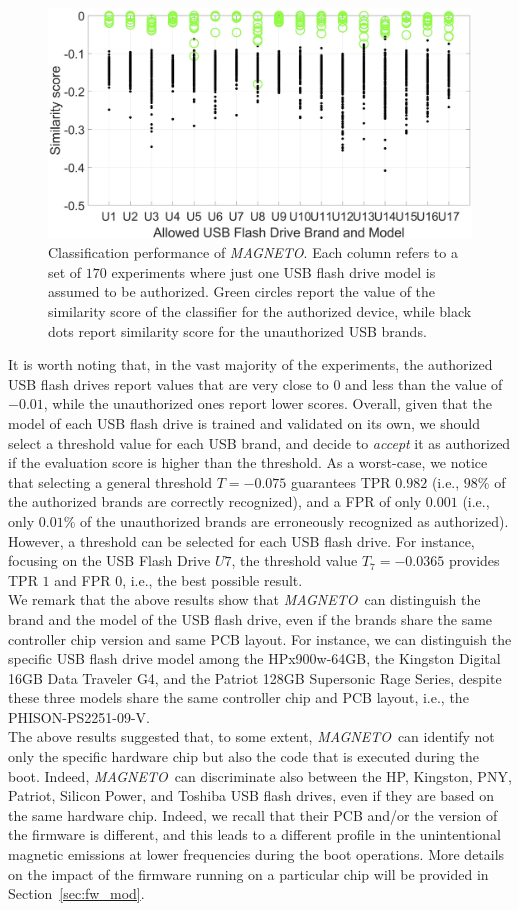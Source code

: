 \documentclass[acmsmall, authorversion]{acmart}
\newcommand{\sol}{\emph{MAGNETO}}
\begin{document}
\begin{figure}[htbp]
    \includegraphics[width=.6\columnwidth]{Figures/scenario1_svm_final.png}
    \centering
    \caption{Classification performance of \sol. Each column refers to a set of $170$ experiments where just one USB flash drive model is assumed to be authorized. Green circles report the value of the similarity score of the classifier for the authorized device, while black dots report similarity score for the unauthorized USB brands.}
    \label{fig:classification_scenario1}
\end{figure}

It is worth noting that, in the vast majority of the experiments, the authorized USB flash drives report values that are very close to $0$ and less than the value of $-0.01$, while the unauthorized ones report lower scores. Overall, given that the model of each USB flash drive is trained and validated on its own, we should select a threshold value for each USB brand, and decide to \emph{accept} it as authorized if the evaluation score is higher than the threshold. As a worst-case, we notice that selecting a general threshold $T=-0.075$ guarantees \ac{TPR} $0.982$ (i.e., $98$\% of the authorized brands are correctly recognized), and a \ac{FPR} of only $0.001$ (i.e., only $0.01$\% of the unauthorized brands are erroneously recognized as authorized). However, a threshold can be selected for each USB flash drive. For instance, focusing on the USB Flash Drive $U7$, the threshold value $T_7 = -0.0365$ provides TPR $1$ and FPR $0$, i.e., the best possible result.\\
We remark that the above results show that \sol\ can distinguish the brand and the model of the USB flash drive, even if the brands share the same controller chip version and same PCB layout. For instance, we can distinguish the specific USB flash drive model among the HPx900w-64GB, the Kingston Digital 16GB Data Traveler G4, and the Patriot 128GB Supersonic Rage Series, despite these three models share the same controller chip and PCB layout, i.e., the PHISON-PS2251-09-V.\\
The above results suggested that, to some extent, \sol\ can identify not only the specific hardware chip but also the code that is executed during the boot. 
Indeed, \sol\ can discriminate also between the HP, Kingston, PNY, Patriot, Silicon Power, and Toshiba USB flash drives, even if they are based on the same hardware chip. Indeed, we recall that their PCB and/or the version of the firmware is different, and this leads to a different profile in the unintentional magnetic emissions at lower frequencies during the boot operations. More details on the impact of the firmware running on a particular chip will be provided in Section~\ref{sec:fw_mod}.
\end{document}
